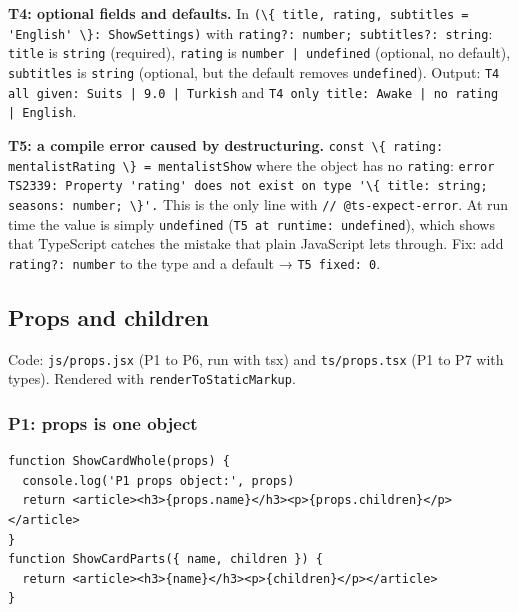 \documentclass[
  10pt,
]{article}
\newcommand{\passthrough}[1]{#1}
\begin{document}
\textbf{T4: optional fields and defaults.} In
\passthrough{\lstinline!(\{ title, rating, subtitles = 'English' \}: ShowSettings)!}
with \passthrough{\lstinline!rating?: number; subtitles?: string!}:
\passthrough{\lstinline!title!} is \passthrough{\lstinline!string!}
(required), \passthrough{\lstinline!rating!} is
\passthrough{\lstinline!number | undefined!} (optional, no default),
\passthrough{\lstinline!subtitles!} is \passthrough{\lstinline!string!}
(optional, but the default removes \passthrough{\lstinline!undefined!}).
Output: \passthrough{\lstinline!T4 all given: Suits | 9.0 | Turkish!}
and
\passthrough{\lstinline!T4 only title: Awake | no rating | English!}.

\textbf{T5: a compile error caused by destructuring.}
\passthrough{\lstinline!const \{ rating: mentalistRating \} = mentalistShow!}
where the object has no \passthrough{\lstinline!rating!}:
\passthrough{\lstinline!error TS2339: Property 'rating' does not exist on type '\{ title: string; seasons: number; \}'.!}
This is the only line with
\passthrough{\lstinline!// @ts-expect-error!}. At run time the value is
simply \passthrough{\lstinline!undefined!}
(\passthrough{\lstinline!T5 at runtime: undefined!}), which shows that
TypeScript catches the mistake that plain JavaScript lets through. Fix:
add \passthrough{\lstinline!rating?: number!} to the type and a default
→ \passthrough{\lstinline!T5 fixed: 0!}.

\hypertarget{props-and-children}{%
\subsection{Props and children}\label{props-and-children}}

Code: \passthrough{\lstinline!js/props.jsx!} (P1 to P6, run with tsx)
and \passthrough{\lstinline!ts/props.tsx!} (P1 to P7 with types).
Rendered with \passthrough{\lstinline!renderToStaticMarkup!}.

\hypertarget{p1-props-is-one-object}{%
\subsubsection{P1: props is one object}\label{p1-props-is-one-object}}

\begin{lstlisting}
function ShowCardWhole(props) {
  console.log('P1 props object:', props)
  return <article><h3>{props.name}</h3><p>{props.children}</p></article>
}
function ShowCardParts({ name, children }) {
  return <article><h3>{name}</h3><p>{children}</p></article>
}
\end{lstlisting}
\end{document}
